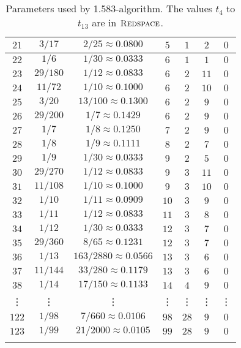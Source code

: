 {\begin{longtable}{|c|c|c|c|c|c|c|}
		$21$ & $3 / 17$ & $2 / 25\approx 0.0800$ & $5$ & $1$ & $2$ & $0$ \\ \hline
		$22$ & $1 / 6$ & $1 / 30\approx 0.0333$ & $6$ & $1$ & $1$ & $0$ \\ \hline
		$23$ & $29 / 180$ & $1 / 12\approx 0.0833$ & $6$ & $2$ & $11$ & $0$ \\ \hline
		$24$ & $11 / 72$ & $1 / 10 \approx 0.1000$ & $6$ & $2$ & $10$ & $0$\\ \hline
		$25$ & $3 / 20$ & $13 / 100\approx 0.1300$ & $6$ & $2$ & $9$ & $0$ \\ \hline
		$26$ & $29 / 200$ & $1 / 7\approx 0.1429$ & $6$ & $2$ & $9$ & $0$ \\ \hline
		$27$ & $1 / 7$ & $1 / 8\approx 0.1250$ & $7$ & $2$ & $9$ & $0$ \\ \hline
		$28$ & $1 / 8$ & $1 / 9\approx 0.1111$ & $8$ & $2$ & $7$ & $0$ \\ \hline
		$29$ & $1 / 9$ & $1 / 30\approx 0.0333$ & $9$ & $2$ & $5$ & $0$ \\ \hline
		$30$ & $29 / 270$ & $1 / 12\approx 0.0833$ & $9$ & $3$ & $11$ & $0$ \\ \hline
		$31$ & $11 / 108$ & $1 / 10\approx 0.1000$ & $9$ & $3$ & $10$ & $0$ \\ \hline
		$32$ & $1 / 10$ & $1 / 11\approx 0.0909$ & $10$ & $3$ & $9$ & $0$ \\ \hline
		$33$ & $1 / 11$ & $1 / 12\approx 0.0833$ & $11$ & $3$ & $8$ & $0$ \\ \hline
		$34$ & $1 / 12$ & $1 / 30\approx 0.0333$ & $12$ & $3$ & $7$ & $0$ \\ \hline
		$35$ & $29 / 360$ & $8 / 65\approx 0.1231$ & $12$ & $3$ & $7$ & $0$ \\ \hline
		$36$ & $1 / 13$ & $163 / 2880\approx 0.0566$ & $13$ & $3$ & $6$ & $0$ \\ \hline
		$37$ & $11 / 144$ & $33 / 280\approx 0.1179$ & $13$ & $3$ & $6$ & $0$ \\ \hline
		$38$ & $1 / 14$ & $17 / 150\approx 0.1133$ & $14$ & $4$ & $9$ & $0$ \\ \hline
		\vdots & \vdots & \vdots & \vdots & \vdots & \vdots & \vdots \\ \hline
		$122$ & $1 / 98$ & $7 / 660\approx 0.0106$ & $98$ & $28$ & $9$ & $0$ \\ \hline
		$123$ & $1 / 99$ & $21 / 2000\approx 0.0105$ & $99$ & $28$ & $9$ & $0$ \\ \hline
		\caption{Parameters used by 1.583-algorithm. The values $t_4$ to $t_{13}$ are in $\mbox{\textsc{Redspace}}$.}
		\label{tab:sonofh_all_parameters}
	\end{longtable}
}


